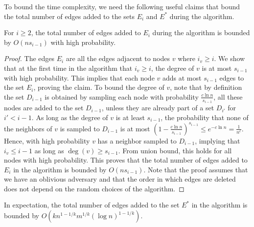 To bound the time complexity, we need the following useful claims that bound the total number of edges added to the sets $E_i$ and $E^*$ during the algorithm.

\begin{claim}\label{claim_Ei}
For $i \geq 2$, the total number of edges added to $E_i$ during the algorithm is bounded by $O(ns_{i-1})$ with high probability.
\end{claim}

\begin{proof}
The edges $E_i$ are all the edges adjacent to nodes $v$ where $i_v \geq i$. We show that at the first time in the algorithm that $i_v \geq i$, the degree of $v$ is at most $s_{i-1}$ with high probability. This implies that each node $v$ adds at most $s_{i-1}$ edges to the set $E_i$, proving the claim. 
To bound the degree of $v$, note that by definition the set $D_{i-1}$ is obtained by sampling each node with probability $\frac{c \ln{n}}{s_{i-1}}$, all these nodes are added to the set $D_{i-1}$, unless they are already part of a set $D_{i'}$ for $i' < i-1$. As long as the degree of $v$ is at least $s_{i-1}$, the probability that none of the neighbors of $v$ is sampled to $D_{i-1}$ is at most $(1-\frac{c\ln{n}}{s_{i-1}})^{s_{i-1}} \leq e^{-c\ln{n}}=\frac{1}{n^c}$. Hence, with high probability $v$ has a neighbor sampled to $D_{i-1}$, implying that $i_v \leq i-1$ as long as $\deg(v) \geq s_{i-1}$. From union bound, this holds for all nodes with high probability. This proves that the total number of edges added to $E_i$ in the algorithm is bounded by $O(ns_{i-1})$. Note that the proof assumes that we have an oblivious adversary and that the order in which edges are deleted does not depend on the random choices of the algorithm.
\end{proof}

\begin{claim}\label{claim_E*}
In expectation, the total number of edges added to the set $E^*$ in the algorithm is bounded by $O(kn^{1-1/k}m^{1/k}(\log{n})^{1-1/k})$.
\end{claim}

